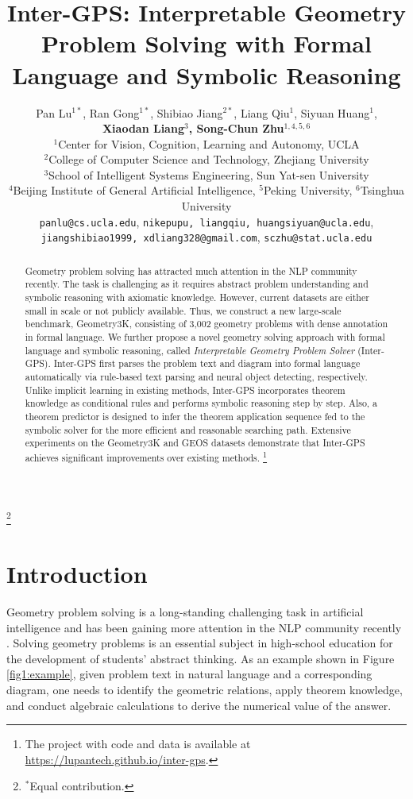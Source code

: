 \documentclass[11pt,a4paper]{article}
\title{Inter-GPS: Interpretable Geometry Problem Solving with Formal Language and Symbolic Reasoning}
\author{Pan Lu$^{1*}$, Ran Gong$^{1*}$, Shibiao Jiang$^{2*}$, Liang Qiu$^1$, Siyuan Huang$^1$, \\ \textbf{Xiaodan Liang$^3$, Song-Chun Zhu$^{1,4,5,6}$}\\
  $^1$Center for Vision, Cognition, Learning and Autonomy, UCLA \\
  $^2$College of Computer Science and Technology, Zhejiang University \\
  $^3$School of Intelligent Systems Engineering, Sun Yat-sen University\\
  $^{4}$Beijing Institute of General Artificial Intelligence, $^{5}$Peking University, $^{6}$Tsinghua University\\
  \texttt{panlu@cs.ucla.edu},
  \texttt{\text{\{}nikepupu, liangqiu, huangsiyuan\text{\}}@ucla.edu}, \\
  \texttt{\text{\{}jiangshibiao1999, xdliang328\text{\}}@gmail.com}, 
  \texttt{sczhu@stat.ucla.edu}
  }
\date{}
\newcommand\blfootnote[1]{%
  \begingroup
  \renewcommand\thefootnote{}\footnote{#1}%
  \addtocounter{footnote}{-1}%
  \endgroup
}
\begin{document}
\maketitle

\blfootnote{$^*$Equal contribution.}

\begin{abstract}
Geometry problem solving has attracted much attention in the NLP community recently. The task is challenging as it requires abstract problem understanding and symbolic reasoning with axiomatic knowledge. However, current datasets are either small in scale or not publicly available. Thus, we construct a new large-scale benchmark, Geometry3K, consisting of 3,002 geometry problems with dense annotation in formal language. We further propose a novel geometry solving approach with formal language and symbolic reasoning, called \textit{Interpretable Geometry Problem Solver} (Inter-GPS). Inter-GPS first parses the problem text and diagram into formal language automatically via rule-based text parsing and neural object detecting, respectively. Unlike implicit learning in existing methods, Inter-GPS incorporates theorem knowledge as conditional rules and performs symbolic reasoning step by step. Also, a theorem predictor is designed to infer the theorem application sequence fed to the symbolic solver for the more efficient and reasonable searching path. Extensive experiments on the Geometry3K and GEOS datasets demonstrate that Inter-GPS achieves significant improvements over existing methods.
\footnote{The project with code and data is available at \url{https://lupantech.github.io/inter-gps}.}




\end{abstract}


\section{Introduction}

Geometry problem solving is a long-standing challenging task in artificial intelligence and has been gaining more attention in the NLP community recently \cite{seo2014diagram,hopkins2019semeval,sachan2020discourse}. Solving geometry problems is an essential subject in high-school education for the development of students' abstract thinking. As an example shown in Figure \ref{fig1:example}, given problem text in natural language and a corresponding diagram, one needs to identify the geometric relations, apply theorem knowledge, and conduct algebraic calculations to derive the numerical value of the answer.
\end{document}
